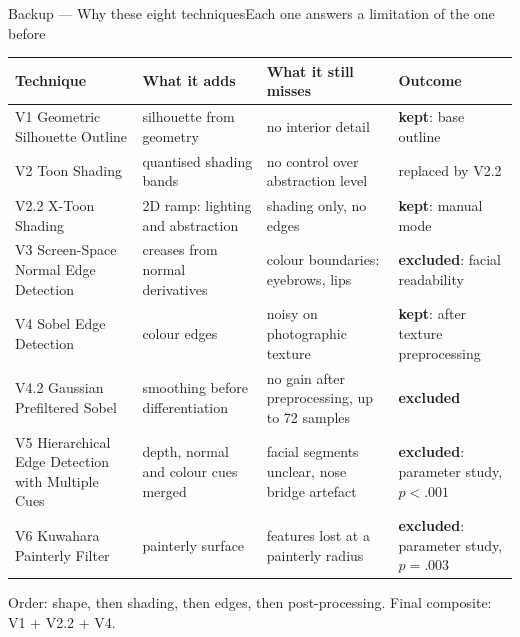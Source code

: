 \documentclass[aspectratio=169,10pt]{beamer}
\newcommand{\good}[1]{{\color{kngreen}\textbf{#1}}}
\newcommand{\bad}[1]{{\color{knred}\textbf{#1}}}
\begin{document}
\begin{frame}{Backup — Why these eight techniques}{Each one answers a limitation of the one before}
  \vspace{0.1em}
  {\tiny
  \setlength{\tabcolsep}{4pt}\renewcommand{\arraystretch}{1.3}
  \begin{tabular}{@{}>{\raggedright\arraybackslash}m{}>{\raggedright\arraybackslash}m{}>{\raggedright\arraybackslash}m{}>{\raggedright\arraybackslash}m{}@{}}
    \toprule
    \textbf{Technique} & \textbf{What it adds} & \textbf{What it still misses} & \textbf{Outcome} \\
    \midrule
    V1 Geometric Silhouette Outline & silhouette from geometry & no interior detail & \good{kept}: base outline \\
    V2 Toon Shading & quantised shading bands & no control over abstraction level & replaced by V2.2 \\
    V2.2 X-Toon Shading & 2D ramp: lighting and abstraction & shading only, no edges & \good{kept}: manual mode \\
    V3 Screen-Space Normal Edge Detection & creases from normal derivatives & colour boundaries: eyebrows, lips & \bad{excluded}: facial readability \\
    V4 Sobel Edge Detection & colour edges & noisy on photographic texture & \good{kept}: after texture preprocessing \\
    V4.2 Gaussian Prefiltered Sobel & smoothing before differentiation & no gain after preprocessing, up to 72 samples & \bad{excluded} \\
    V5 Hierarchical Edge Detection with Multiple Cues & depth, normal and colour cues merged & facial segments unclear, nose bridge artefact & \bad{excluded}: parameter study, $p<.001$ \\
    V6 Kuwahara Painterly Filter & painterly surface & features lost at a painterly radius & \bad{excluded}: parameter study, $p=.003$ \\
    \bottomrule
  \end{tabular}\par}
  \vspace{0.5em}
  {\scriptsize\color{knblue}Order: shape, then shading, then edges, then post-processing. Final composite: V1 + V2.2 + V4.\par}
\end{frame}
\end{document}
